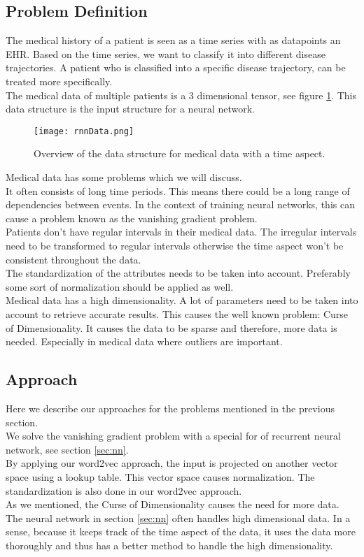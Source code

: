 \subsection{Problem Definition}

The medical history of a patient is seen as a time series with as datapoints an EHR. Based on the time series, we want to classify it into different disease trajectories. A patient who is classified into a specific disease trajectory, can be treated more specifically. \\

The medical data of multiple patients is a $3$ dimensional tensor, see figure \ref{fig:rnnData}. This data structure is the input structure for a neural network.

\begin{figure}[H]
	\centering
	\texttt{[image: rnnData.png]}
	\caption{Overview of the data structure for medical data with a time aspect.}
	\label{fig:rnnData}
\end{figure} 

Medical data has some problems which we will discuss.\\
It often consists of long time periods. This means there could be a long range of dependencies between events. In the context of training neural networks, this can cause a problem known as the vanishing gradient problem. \\
Patients don't have regular intervals in their medical data. The irregular intervals need to be transformed to regular intervals otherwise the time aspect won't be consistent throughout the data. \\
The standardization of the attributes needs to be taken into account. Preferably some sort of normalization should be applied as well. \\
Medical data has a high dimensionality. A lot of parameters need to be taken into account to retrieve accurate results. This causes the well known problem: Curse of Dimensionality. It causes the data to be sparse and therefore, more data is needed. Especially in medical data where outliers are important. 


\subsection{Approach}

Here we describe our approaches for the problems mentioned in the previous section. \\
We solve the vanishing gradient problem with a special for of recurrent neural network, see section \ref{sec:nn}. \\
By applying our word2vec approach, the input is projected on another vector space using a lookup table. This vector space causes normalization. The standardization is also done in our word2vec approach. \\
As we mentioned, the Curse of Dimensionality causes the need for more data. The neural network in section \ref{sec:nn} often handles high dimensional data. In a sense, because it keeps track of the time aspect of the data, it uses the data more thoroughly and thus has a better method to handle the high dimensionality.

